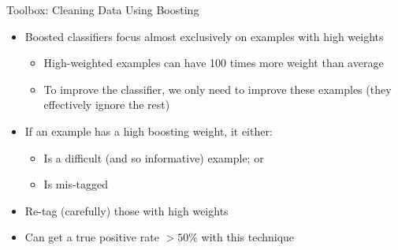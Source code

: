 \documentclass{beamer}
\begin{document}
\begin{frame}{Toolbox: Cleaning Data Using Boosting}
  
  \begin{itemize}
  \item Boosted classifiers focus \alert{almost exclusively} on examples with \alert{high weights}
    \begin{itemize}
    \item High-weighted examples can have 100 times more weight than average
    \item To improve the classifier, we only need to improve these examples (they effectively ignore the rest)
    \end{itemize}
  \item If an example has a high boosting weight, it either:
    \begin{itemize}
    \item Is a difficult (and so informative) example; or
    \item Is mis-tagged
    \end{itemize}
  \item Re-tag (carefully) those with high weights
  \item Can get a true positive rate $> 50\%$ with this technique
  \end{itemize}
  
\end{frame}
\end{document}
